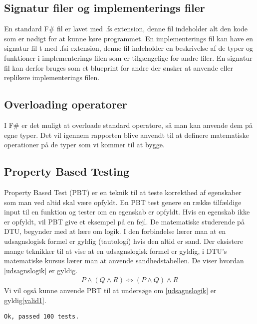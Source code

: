 \subsection{Signatur filer og implementerings filer}
En standard F\# fil er lavet med .fs extension, denne fil indeholder alt den kode som er nødigt for at kunne køre programmet. En implementerings fil kan have en signatur fil t med .fsi extension, denne fil indeholder en beskrivelse af de typer og funktioner i implementerings filen som er tilgængelige for andre filer. En signatur fil kan derfor bruges som et blueprint for andre der ønsker at anvende eller replikere implementerings filen. 

\subsection{Overloading operatorer}
I F\# er det muligt at overloade standard operatore, så man kan anvende dem på egne typer. Det vil igennem rapporten blive anvendt til at definere matematiske operationer på de typer som vi kommer til at bygge.

\subsection{Property Based Testing}
Property Based Test (PBT) er en teknik til at teste korrekthed af egenskaber som man ved altid skal være opfyldt. En PBT test genere en række tilfældige input til en funktion og tester om en egenskab er opfyldt. Hvis en egenskab ikke er opfyldt, vil PBT give et eksempel på en fejl. De matematiske studerende på DTU, begynder med at lære om logik. I den forbindelse lærer man at en udsagnslogisk formel er gyldig (tautologi) hvis den altid er sand. Der eksistere mange teknikker til at vise at en udsagnslogisk formel er gyldig, i DTU's matematiske kursus lærer man at anvende sandhedstabellen. De viser hvordan \ref{udsagnslogik} er gyldig. 
\begin{gather}
    P \land (Q \land R) \iff (P \land Q) \land R
    \label{udsagnslogik}
\end{gather}
Vi vil også kunne anvende PBT til at undersøge om \ref{udsagnslogik} er gyldig\ref{valid1}.



\begin{lstlisting}[style=output, label={lst:output_example}, caption={Output \ref{valid1}}]
Ok, passed 100 tests.
\end{lstlisting}


